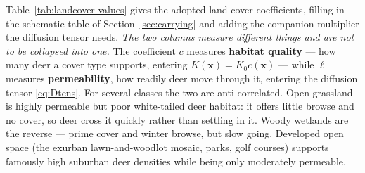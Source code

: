 \documentclass[11pt]{article}
\begin{document}
Table~\ref{tab:landcover-values} gives the adopted land-cover coefficients, filling in the schematic table of Section~\ref{sec:carrying} and adding the companion multiplier the diffusion tensor needs. \emph{The two columns measure different things and are not to be collapsed into one.} The coefficient $c$ measures \textbf{habitat quality} --- how many deer a cover type supports, entering $K(\mathbf{x}) = K_0 c(\mathbf{x})$ --- while $\ell$ measures \textbf{permeability}, how readily deer move through it, entering the diffusion tensor \eqref{eq:Dtens}. For several classes the two are anti-correlated. Open grassland is highly permeable but poor white-tailed deer habitat: it offers little browse and no cover, so deer cross it quickly rather than settling in it. Woody wetlands are the reverse --- prime cover and winter browse, but slow going. Developed open space (the exurban lawn-and-woodlot mosaic, parks, golf courses) supports famously high suburban deer densities while being only moderately permeable.
\end{document}
